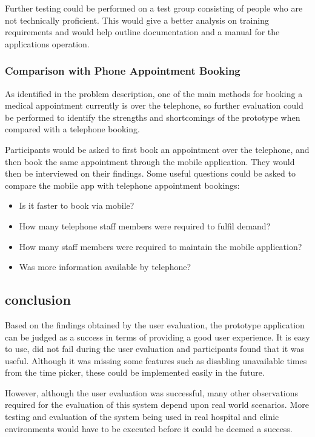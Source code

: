 Further testing could be performed on a test group consisting of people who are not technically proficient. This would give a better analysis on training requirements and would help outline documentation and a manual for the applications operation.

\subsubsection{Comparison with Phone Appointment Booking}

As identified in the problem description, one of the main methods for booking a medical appointment currently is over the telephone, so further evaluation could be performed to identify the strengths and shortcomings of the prototype when compared with a telephone booking.

Participants would be asked to first book an appointment over the telephone, and then book the same appointment through the mobile application. They would then be interviewed on their findings. Some useful questions could be asked to compare the mobile app with telephone appointment bookings:

\begin{itemize}
	\item Is it faster to book via mobile?
	\item How many telephone staff members were required to fulfil demand?
	\item How many staff members were required to maintain the mobile application?
	\item Was more information available by telephone?
\end{itemize}

\subsection{conclusion}

Based on the findings obtained by the user evaluation, the prototype application can be judged as a success in terms of providing a good user experience. It is easy to use, did not fail during the user evaluation and participants found that it was useful. Although it was missing some features such as disabling unavailable times from the time picker, these could be implemented easily in the future.

However, although the user evaluation was successful, many other observations required for the evaluation of this system depend upon real world scenarios. More testing and evaluation of the system being used in real hospital and clinic environments would have to be executed before it could be deemed a success.

